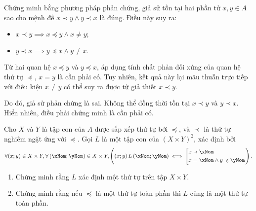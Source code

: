 \stepSubexercise Chứng minh bằng phương pháp phản chứng, giả sử tồn tại hai phần tử $x, y \in A$ sao cho mệnh đề $x \prec y \wedge y \prec x$ là đúng. Điều này suy ra:
\begin{itemize}
   \item $x \prec y \implies x \preccurlyeq y \land x \neq y$;
   \item $y \prec x \implies y \preccurlyeq x \land y \neq x$.
\end{itemize}
Từ hai quan hệ $x \preccurlyeq y$ và $y \preccurlyeq x$, áp dụng tính chất phản đối xứng của quan hệ thứ tự $\preccurlyeq$, $x = y$ là cần phải có. Tuy nhiên, kết quả này lại mâu thuẫn trực tiếp với điều kiện $x \neq y$ có thể suy ra được từ giả thiết $x \prec y$.

Do đó, giả sử phản chứng là sai. Không thể đồng thời tồn tại $x \prec y$ và $y \prec x$. Hiển nhiên, điều phải chứng minh là cần phải có.

\exercise Cho $X$ và $Y$ là tập con của $A$ được sắp xếp thứ tự bởi $\preccurlyeq$, và $\prec$ là thứ tự nghiêm ngặt ứng với $\preccurlyeq$. Gọi $L$ là một tập con của $(X \times Y)^2$, xác định bởi
\begin{equation*}
   \forall (x; y) \in X \times Y, \forall \left(\xNom; \yNom\right) \in X \times Y, \left((x; y)\,L\left(\xNom; \yNom\right) \iff \left[\begin{aligned}
      &x \prec \xNom \\
      &x = \xNom \land y \preccurlyeq \yNom
   \end{aligned}\right.\right).
\end{equation*}
\begin{enumerate}
   \item Chứng minh rằng $L$ xác định một thứ tự trên tập $X \times Y$.
   \item Chứng minh rằng nếu $\preccurlyeq$ là một thứ tự toàn phần thì $L$ cũng là một thứ tự toàn phần.
\end{enumerate}

\solution

